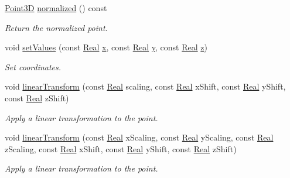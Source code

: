 \begin{DoxyCompactItemize}
\hyperlink{classFVCode3D_1_1Point3D}{Point3D} \hyperlink{classFVCode3D_1_1Point3D_acc1ad771660943c0dc2ae28c73fcf866}{normalized} () const 
\begin{DoxyCompactList}\small\item\em Return the normalized point. \end{DoxyCompactList}\item 
void \hyperlink{classFVCode3D_1_1Point3D_af250a1c49cf1aeeb52f59a687257451d}{set\+Values} (const \hyperlink{namespaceFVCode3D_a40c1f5588a248569d80aa5f867080e83}{Real} \hyperlink{classFVCode3D_1_1Point3D_ae015d6aa31f8b304f69696bdcbd4da19}{x}, const \hyperlink{namespaceFVCode3D_a40c1f5588a248569d80aa5f867080e83}{Real} \hyperlink{classFVCode3D_1_1Point3D_a950abcabbf3bb32fc2daf64c28d77416}{y}, const \hyperlink{namespaceFVCode3D_a40c1f5588a248569d80aa5f867080e83}{Real} \hyperlink{classFVCode3D_1_1Point3D_a865109e2006cc1de3681ab601081f5aa}{z})
\begin{DoxyCompactList}\small\item\em Set coordinates. \end{DoxyCompactList}\item 
void \hyperlink{classFVCode3D_1_1Point3D_a2044e0fdef7e870557c89ad0edb0b0d4}{linear\+Transform} (const \hyperlink{namespaceFVCode3D_a40c1f5588a248569d80aa5f867080e83}{Real} scaling, const \hyperlink{namespaceFVCode3D_a40c1f5588a248569d80aa5f867080e83}{Real} x\+Shift, const \hyperlink{namespaceFVCode3D_a40c1f5588a248569d80aa5f867080e83}{Real} y\+Shift, const \hyperlink{namespaceFVCode3D_a40c1f5588a248569d80aa5f867080e83}{Real} z\+Shift)
\begin{DoxyCompactList}\small\item\em Apply a linear transformation to the point. \end{DoxyCompactList}\item 
void \hyperlink{classFVCode3D_1_1Point3D_a41c0aeb4de5f0f08a15f0aa9ff22e44b}{linear\+Transform} (const \hyperlink{namespaceFVCode3D_a40c1f5588a248569d80aa5f867080e83}{Real} x\+Scaling, const \hyperlink{namespaceFVCode3D_a40c1f5588a248569d80aa5f867080e83}{Real} y\+Scaling, const \hyperlink{namespaceFVCode3D_a40c1f5588a248569d80aa5f867080e83}{Real} z\+Scaling, const \hyperlink{namespaceFVCode3D_a40c1f5588a248569d80aa5f867080e83}{Real} x\+Shift, const \hyperlink{namespaceFVCode3D_a40c1f5588a248569d80aa5f867080e83}{Real} y\+Shift, const \hyperlink{namespaceFVCode3D_a40c1f5588a248569d80aa5f867080e83}{Real} z\+Shift)
\begin{DoxyCompactList}\small\item\em Apply a linear transformation to the point. \end{DoxyCompactList}\item 

\end{DoxyCompactItemize}
